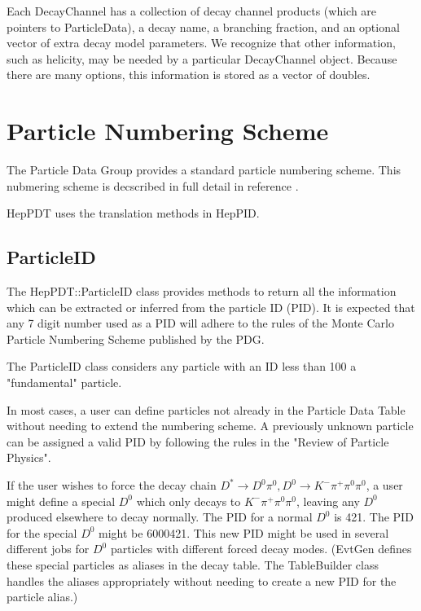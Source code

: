 Each DecayChannel has a collection of decay channel products
(which are pointers to ParticleData), a decay name, a branching fraction,
and an optional vector of extra decay model parameters.  
We recognize that other information, such
as helicity, may be needed by a particular DecayChannel object.
Because there are many options, 
this information is stored as a vector of doubles.  



\section { Particle Numbering Scheme }

The Particle Data Group \cite{pdg} provides a standard particle 
numbering scheme.
This nubmering scheme is decscribed in full detail in
reference \cite{scheme}.

HepPDT uses the translation methods in HepPID.\cite{heppid}

\subsection { ParticleID }

The HepPDT::ParticleID class  
provides methods to return all the information
which can be extracted or inferred from the particle ID (PID).
It is expected that any 7 digit number used as a PID will adhere to the 
rules of the Monte Carlo Particle Numbering Scheme published by the
PDG.\cite{pdg}

The ParticleID class considers any particle with 
an ID less than 100 a "fundamental" particle.

In most cases, a user can define particles not already in the
Particle Data Table without needing to extend the numbering scheme.
A previously unknown particle can be assigned a valid PID by
following the rules in the "Review of Particle Physics".\cite{pdg}

If the user wishes to force the decay chain 
$D^* \rightarrow D^0 \pi^0, D^0 \rightarrow K^- \pi^+ \pi^0 \pi^0$,
a user might define a special $D^0$ which only decays to 
$K^- \pi^+ \pi^0 \pi^0$, leaving any $D^0$ produced elsewhere to decay normally.
The PID for a normal $D^0$ is 421.  The PID for the special $D^0$
might be 6000421.   This new PID might be used in several different jobs
for $D^0$ particles with different forced decay modes.
(EvtGen defines these special particles as aliases in the decay table.
The TableBuilder class handles the aliases appropriately without needing
to create a new PID for the particle alias.)

